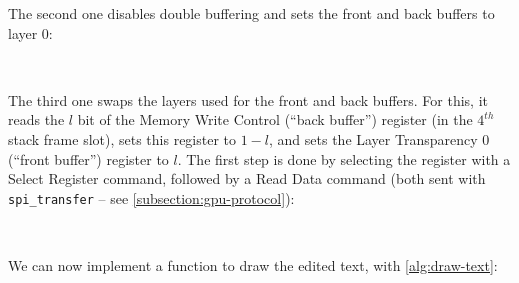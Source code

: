 The second one disables double buffering and sets the front and back buffers to
layer 0:

\begin{TwoColumns}
\\
\end{TwoColumns}

The third one swaps the layers used for the front and back buffers. For
this, it reads the $l$ bit of the Memory Write Control (``back buffer'')
register (in the $4^{th}$ stack frame slot), sets this register to $1-l$, and
sets the Layer Transparency 0 (``front buffer'') register to $l$. The first
step is done by selecting the register with a Select Register command, followed
by a Read Data command (both sent with \verb!spi_transfer! -- see
\cref{subsection:gpu-protocol}):

\begin{TwoColumns}
\\
\end{TwoColumns}

We can now implement a function to draw the edited text, with
\cref{alg:draw-text}:

